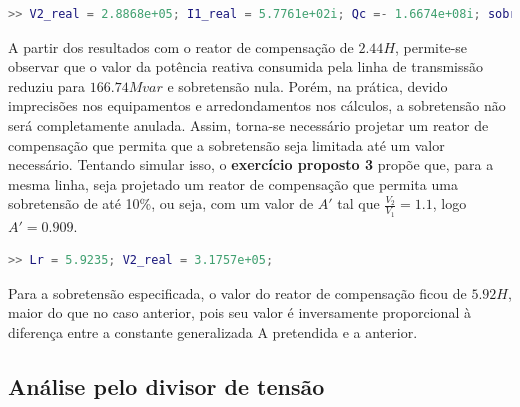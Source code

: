 

\begin{lstlisting}[language=Matlab,style=consolestyle]
>> V2_real = 2.8868e+05; I1_real = 5.7761e+02i; Qc =- 1.6674e+08i; sobretensao = 0; M(1,1) = A_novo = 1;
\end{lstlisting}

A partir dos resultados com o reator de compensação de $2.44H$, permite-se observar que o valor da potência reativa consumida pela linha de transmissão reduziu para $166.74 Mvar$ e sobretensão nula. Porém, na prática, devido imprecisões nos equipamentos e arredondamentos nos cálculos, a sobretensão não será completamente anulada. Assim, torna-se necessário projetar um reator de compensação que permita que a sobretensão seja limitada até um valor necessário. Tentando simular isso, o \textbf{exercício proposto 3} propõe que, para a mesma linha, seja projetado um reator de compensação que permita uma sobretensão de até 10\%, ou seja, com um valor de $A'$ tal que $\frac{V_2}{V_1}=1.1$, logo $A'=0.909$.



\begin{lstlisting}[language=Matlab,style=consolestyle]
>> Lr = 5.9235; V2_real = 3.1757e+05;
\end{lstlisting}

Para a sobretensão especificada, o valor do reator de compensação ficou de $5.92H$, maior do que no caso anterior, pois seu valor é inversamente proporcional à diferença entre a constante generalizada A pretendida e a anterior.

\subsection{Análise pelo divisor de tensão}


